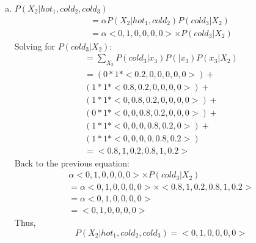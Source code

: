 \documentclass{article}
\begin{document}
\begin{enumerate}[a)]
    \clearpage
    \item $P(X_2|hot_1,cold_2,cold_3)$
    \begin{gather*}
        = \alpha P(X_2 | hot_1, cold_2)P(cold_3|X_2) \\
        = \alpha <0, 1, 0, 0, 0, 0> \times P(cold_3 | X_2)
    \end{gather*}
    Solving for $P(cold_3|X_2)$:
    \begin{gather*}
        = \sum_{X_3}P(cold_3|x_3)P(|x_3)P(x_3|X_2)\\
        = (0 * 1 * <0.2, 0, 0, 0, 0, 0>) + \\
        (1 * 1 * <0.8, 0.2, 0, 0, 0, 0>) + \\
        (1 * 1 *  <0, 0.8, 0.2, 0, 0, 0 ,0>) +\\
        (0 * 1 * <0, 0, 0.8, 0.2, 0 ,0 ,0>) + \\
        (1 * 1 *  <0, 0, 0, 0.8, 0.2, 0>) + \\
        (1 * 1 *  <0, 0, 0, 0, 0.8, 0.2>) \\
        = <0.8, 1, 0.2, 0.8, 1, 0.2>
    \end{gather*}
    Back to the previous equation:
    \begin{gather*}
        \alpha <0, 1, 0, 0, 0, 0> \times P(cold_3 | X_2)\\
        = \alpha <0, 1, 0, 0, 0, 0> \times <0.8, 1, 0.2, 0.8, 1, 0.2>\\
        = \alpha <0, 1, 0, 0, 0, 0>\\ = <0, 1, 0, 0, 0, 0>
    \end{gather*}
    Thus,
    \[
        P(X_2|hot_1,cold_2,cold_3) = <0, 1, 0, 0, 0, 0>
    \]
    

\end{enumerate}
\end{document}
